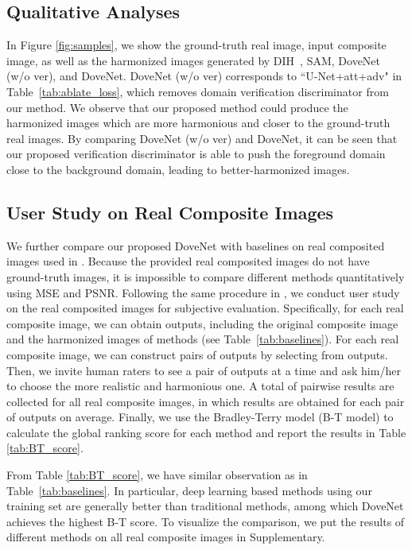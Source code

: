 \documentclass[10pt,twocolumn,letterpaper]{article}
\begin{document}
\subsection{Qualitative Analyses}
In Figure \ref{fig:samples}, we show the ground-truth real image, input composite image, as well as the harmonized images generated by DIH~\cite{tsai2017deep}, SAM\cite{xiaodong2019improving}, DoveNet (w/o ver), and DoveNet. DoveNet (w/o ver) corresponds to ``U-Net+att+adv" in Table~\ref{tab:ablate_loss}, which removes domain verification discriminator from our method.
We observe that our proposed method could produce the harmonized images which are more harmonious and closer to the ground-truth real images. By comparing DoveNet (w/o ver) and DoveNet, it can be seen that our proposed verification discriminator is able to push the foreground domain close to the background domain, leading to better-harmonized images.

\subsection{User Study on Real Composite Images}
We further compare our proposed DoveNet with baselines on  real composited images used in \cite{tsai2017deep}. Because the provided  real composited images do not have ground-truth images, it is impossible to compare different methods quantitatively using MSE and PSNR. Following the same procedure in \cite{tsai2017deep}, we conduct user study on the  real composited images for subjective evaluation. Specifically, for each real composite image, we can obtain  outputs, including the original composite image and the harmonized images of  methods (see Table~\ref{tab:baselines}). For each real composite image, we can construct pairs of outputs by selecting from  outputs. Then, we invite  human raters to see a pair of outputs at a time and ask him/her to choose the more realistic and harmonious one. A total of  pairwise results are collected for all  real composite images, in which  results are obtained for each pair of outputs on average. Finally, we use the Bradley-Terry model (B-T model) \cite{bradley1952rank, lai2016comparative} to calculate the global ranking score for each method and report the results in Table \ref{tab:BT_score}.

From Table \ref{tab:BT_score}, we have similar observation as in Table~\ref{tab:baselines}. In particular, deep learning based methods using our training set are generally better than traditional methods, among which DoveNet achieves the highest B-T score. To visualize the comparison, we put the results of different methods on all  real composite images in Supplementary.
\end{document}
